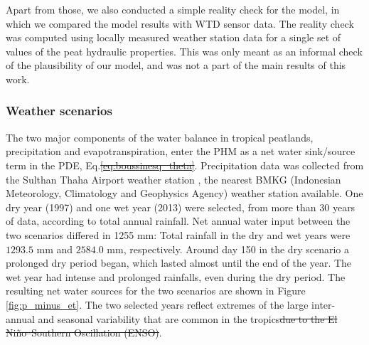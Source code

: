 \documentclass[bg, manuscript]{copernicus}
\providecommand{\DIFadd}[1]{{\protect\color{blue}\uwave{#1}}} %
\providecommand{\DIFdel}[1]{{\protect\color{red}\sout{#1}}}                      %
\providecommand{\DIFaddbegin}{} %
\providecommand{\DIFaddend}{} %
\providecommand{\DIFdelbegin}{} %
\providecommand{\DIFdelend}{} %
\begin{document}
Apart from those, we also conducted a simple reality check for the model, in which we \DIFaddbegin \DIFadd{visually }\DIFaddend compared the model results with WTD sensor data.
The reality check was computed using locally measured weather station data for a single set of values of the peat  hydraulic properties.
This was only meant as an informal check of the  plausibility of our model, and was not a part of the main results of this work.


\subsubsection{Weather scenarios}
The two major components of the water balance in tropical peatlands, precipitation and evapotranspiration, enter the PHM as a net water sink/source term in the PDE, Eq.\DIFdelbegin \DIFdel{\eqref{eq:boussinesq_theta}}\DIFdelend \DIFaddbegin \DIFadd{\eqref{eq:boussinesq}}\DIFaddend .
Precipitation data was collected from the Sulthan Thaha Airport weather station \DIFaddbegin \DIFadd{($1^\circ 38' 1''$ S $103^\circ 38' 24''$ E)}\DIFaddend , the nearest BMKG (Indonesian Meteorology, Climatology and Geophysics Agency) weather station available.
One dry year (1997) and one wet year (2013) were selected, from more than 30 years of data, according to total annual rainfall.
Net annual water input between the two scenarios differed in 1255 \unit{mm}: Total rainfall in the dry and wet years were $1293.5$ \unit{mm} and $2584.0$ \unit{mm}, respectively.
Around day 150 in the dry scenario a prolonged dry period began, which lasted almost until the end of the year.
The wet year had intense and prolonged rainfalls, even during the dry period.
The resulting net water sources for the two scenarios are shown in Figure \ref{fig:p_minus_et}.
The two selected years  reflect extremes of the large inter-annual and seasonal variability that are common in the tropics\DIFdelbegin \DIFdel{due to the El Niño–Southern Oscillation (ENSO)}\DIFdelend .
\end{document}
